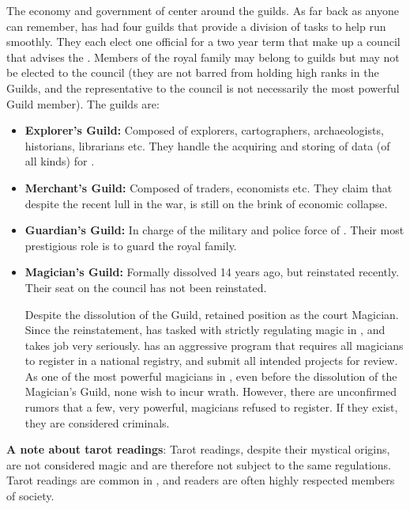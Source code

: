 \documentclass[blue]{NeptuneBall}
\begin{document}
The economy and government of \pAtlantis{} center around the guilds. As far back as anyone can remember, \pAtlantis{} has had four guilds that provide a division of tasks to help \pAtlantis{} run smoothly. They each elect one official for a two year term that make up a council that advises the \cKing{\King}.  Members of the royal family may belong to guilds but may not be elected to the council (they are not barred from holding high ranks in the Guilds, and the representative to the council is not necessarily the most powerful Guild member). The guilds are:
\begin{itemize}
  \item {\bf Explorer's Guild:} Composed of explorers, cartographers, archaeologists, historians, librarians etc. They handle the acquiring and storing of data (of all kinds) for \pAtlantis{}.
  \item{\bf Merchant's Guild:} Composed of traders, economists etc. They claim that despite the recent lull in the war, \pAtlantis{} is still on the brink of economic collapse.
  \item {\bf Guardian's Guild:} In charge of the military and police force of \pAtlantis{}. Their most prestigious role is to guard the royal family.
  \item {\bf Magician's Guild:}  Formally dissolved 14 years ago, but reinstated recently. Their seat on the council has not been reinstated.
  
  Despite the dissolution of the Guild, \cManta{} retained \cManta{\their} position as the court Magician. Since the reinstatement, \cKing{} has tasked \cManta{} with strictly regulating magic in \pAtlantis{}, and \cManta{} takes \cManta{\their} job very seriously. \cManta{} has an aggressive program that requires all magicians to register in a national registry, and submit all intended projects for review. As one of the most powerful magicians in \pAtlantis{}, even before the dissolution of the Magician's Guild, none wish to incur \cManta{\their} wrath. However, there are unconfirmed rumors that a few, very powerful, magicians refused to register. If they exist, they are considered criminals.\\
  
\end{itemize}
  {\bf A note about tarot readings}: Tarot readings, despite their mystical origins, are not considered magic and are therefore not subject to the same regulations. Tarot readings are common in \pAtlantis{}, and readers are often highly respected members of society.
\end{document}
